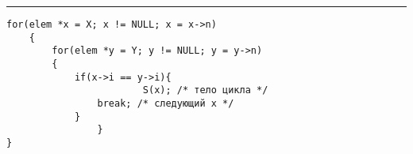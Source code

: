 \vspace{5pt} \hrule
\begin{lstlisting}[caption={Итератор пересечения множеств}, label=p_46, escapechar=\`]
for(elem *x = X; x != NULL; x = x->n)
	{
		for(elem *y = Y; y != NULL; y = y->n)
		{
			if(x->i == y->i){
	                	S(x); /* тело цикла */
				break; /* следующий x */
			}
                }
}
\end{lstlisting}
